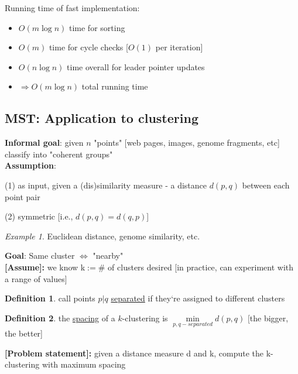 \documentclass[a4paper,12pt]{article}
\theoremstyle{plain}
\theoremstyle{definition}
\newtheorem*{definition}{Definition}
\theoremstyle{remark}
\newtheorem*{example}{Example}
\begin{document}
Running time of fast implementation:
\begin{itemize}
	\item $O(m \log n)$ time for sorting
	\item $O(m)$ time for cycle checks [$O(1)$ per iteration]
	\item $O(n \log n)$ time overall for leader pointer updates
	\item $\Rightarrow O(m \log n)$ total running time
\end{itemize}



\subsection{MST: Application to clustering}
\textbf{Informal goal}: given $n$ "points" [web pages, images, genome fragments, etc] classify into "coherent groups"
\\

\textbf{Assumption}:
\begin{description}
	\item{(1)} as input, given a (dis)similarity measure - a distance $d(p, q)$ between each point pair
	\item{(2)} symmetric [i.e., $d(p, q) = d(q, p)$]
\end{description}

\begin{example}Euclidean distance, genome similarity, etc.\\\end{example}


\textbf{Goal}: Same cluster $\iff$ "nearby"
\\

\textbf{[Assume]:} we know k$:= \#$ of clusters desired [in practice, can experiment with a range of values]
\\

\begin{definition} call points $p|q$ \underline{separated} if they`re assigned to different clusters\end{definition}
\begin{definition} the \underline{spacing} of a $k$-clustering is $\min\limits_{p,q-separated} d(p, q)$ [the bigger, the better]\end{definition}

\textbf{[Problem statement]:} given a distance measure d and k, compute the k-clustering with maximum spacing
\\
\end{document}
